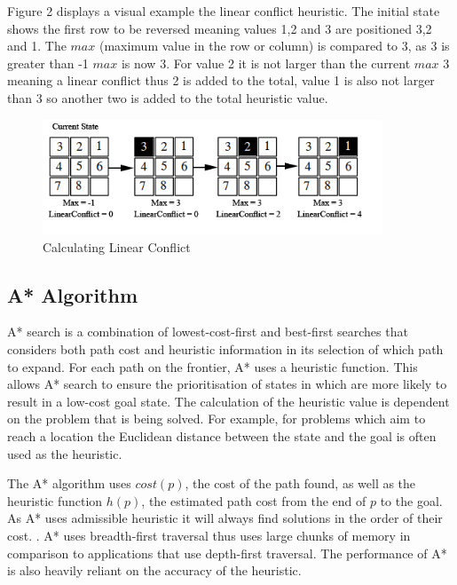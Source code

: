 \documentclass[final]{cmpreport}
\begin{document}
Figure 2 displays a visual example the linear conflict heuristic. The initial state shows the first row to be reversed meaning values 1,2 and 3 are positioned 3,2 and 1. The $max$ (maximum value in the row or column) is compared to 3, as 3 is greater than -1 $max$ is now 3. For value 2 it is not larger than the current $max$ 3 meaning a linear conflict thus 2 is added to the total, value 1 is also not larger than 3 so another two is added to the total heuristic value.


\begin{figure}[ht]
	\centering
	\includegraphics[width=0.9\textwidth]{linear}
	\captionsetup{justification=centering}
	\caption{Calculating Linear Conflict}
\end{figure}



\subsection{A* Algorithm}
A* search is a combination of lowest-cost-first and best-first searches that considers both path cost and heuristic information in its selection of which path to expand. For each path on the frontier, A* uses a heuristic function. This allows A* search to ensure the prioritisation of states in which are more likely to result in a low-cost goal state. The calculation of the heuristic value is dependent on the problem that is being solved. For example, for problems which aim to reach a location the Euclidean distance between the state and the goal is often used as the heuristic. 

The A* algorithm uses $cost(p)$, the cost of the path found, as well as the heuristic function $h(p)$, the estimated path cost from the end of $p$ to the goal. As A* uses admissible heuristic it will always find solutions in the order of their cost. \citep{DBLP:journals/ker/Brewka96}.  A* uses breadth-first traversal thus uses large chunks of memory in comparison to applications that use depth-first traversal. The performance of A* is also heavily reliant on the accuracy of the heuristic.
\end{document}
